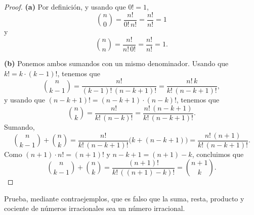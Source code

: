 \documentclass[12pt,a4paper]{article}
\begin{document}
    \begin{proof}
        \textbf{(a)} Por definición, y usando que $0!=1$,
        \begin{equation*}
            \binom{n}{0}=\frac{n!}{0!\,n!}=\frac{n!}{n!}=1
        \end{equation*}
        y
        \begin{equation*}
            \binom{n}{n}=\frac{n!}{n!\,0!}=\frac{n!}{n!}=1.
        \end{equation*}

        \textbf{(b)} Ponemos ambos sumandos con un mismo denominador. Usando que $k!=k\cdot(k-1)!$, tenemos que
        \begin{equation*}
            \binom{n}{k-1}=\frac{n!}{(k-1)!\,(n-k+1)!}=\frac{n!\,k}{k!\,(n-k+1)!},
        \end{equation*}
        y usando que $(n-k+1)!=(n-k+1)\cdot(n-k)!$, tenemos que
        \begin{equation*}
            \binom{n}{k}=\frac{n!}{k!\,(n-k)!}=\frac{n!\,(n-k+1)}{k!\,(n-k+1)!}.
        \end{equation*}
        Sumando,
        \begin{equation*}
            \binom{n}{k-1}+\binom{n}{k}=\frac{n!}{k!\,(n-k+1)!}\bigl(k+(n-k+1)\bigr)=\frac{n!\,(n+1)}{k!\,(n-k+1)!}.
        \end{equation*}
        Como $(n+1)\cdot n!=(n+1)!$ y $n-k+1=(n+1)-k$, concluimos que
        \begin{equation*}
            \binom{n}{k-1}+\binom{n}{k}=\frac{(n+1)!}{k!\,((n+1)-k)!}=\binom{n+1}{k}.
        \end{equation*}
    \end{proof}

    \begin{problema}
        Prueba, mediante contraejemplos, que es falso que la suma, resta, producto y cociente de números irracionales sea un número irracional.
    \end{problema}
\end{document}
